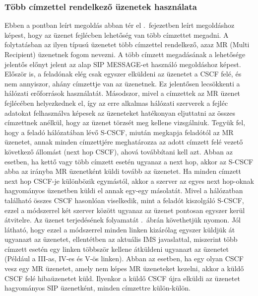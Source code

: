 \subsubsection{Több címzettel rendelkező üzenetek használata}
\label{sec:mr_message}

Ebben a pontban leírt megoldás abban tér el .~fejezetben leírt megoldáshoz képest, hogy az üzenet fejlécben lehetőség van több címzettet megadni. A folytatásban az ilyen típusú üzenetet több címzettel rendelkező, azaz MR (Multi Recipient) üzenetnek fogom nevezni. A több címzett megadásának a lehetősége jelentős előnyt jelent az alap SIP MESSAGE-et használó megoldáshoz képest. Először is, a feladónak elég csak egyszer elküldeni az üzenetet a CSCF felé, és nem annyiszor, ahány címzettje van az üzenetnek. Ez jelentősen lecsökkenti a hálózati erőforrások használatát. Másodszor, mivel a címzettek az MR üzenet fejlécében helyezkednek el, így az erre alkalmas hálózati szerverek a fejléc adatokat felhasználva képesek az üzeneteket hatékonyan eljuttatni az összes címzettnek anélkül, hogy az üzenet törzsét meg kellene vizsgálniuk. Tegyük fel, hogy a feladó hálózatában lévő S-CSCF, miután megkapja feladótól az MR üzenetet, annak minden címzettjére meghatározza az adott címzett felé vezető következő állomást (next hop CSCF), ahová továbbítani kell azt. Abban az esetben, ha kettő vagy több címzett esetén ugyanaz a next hop, akkor az S-CSCF abba az irányba MR üzenetként küldi tovább az üzenetet. Ha minden címzett next hop CSCF-je különbözik egymástól, akkor a szerver az egyes next hop-oknak hagyományos üzenetben küldi el annak egy-egy másolatát. Mivel a hálózatban található összes CSCF hasonlóan viselkedik, mint a feladót kiszolgáló S-CSCF, ezzel a módszerrel két szerver között ugyanaz az üzenet pontosan egyszer kerül átvitelre. Az üzenet terjedésének folyamatát .~ábrán követhetjük nyomon. Jól látható, hogy ezzel a módszerrel minden linken kizárólag egyszer küldjük át ugyanazt az üzenetet, ellentétben az aktuális IMS javaslattal, miszerint több címzett esetén egy linken többször kellene átküldeni ugyanazt az üzenetet (Például a III-as, IV-es és V-ös linken). Abban az esetben, ha egy olyan CSCF vesz egy MR üzenetet, amely nem képes MR üzeneteket kezelni, akkor a küldő CSCF felé hibaüzenetet küld. Ilyenkor a küldő CSCF újra elküldi az üzenetet hagyományos SIP üzenetként, minden címzettre külön-külön. 

